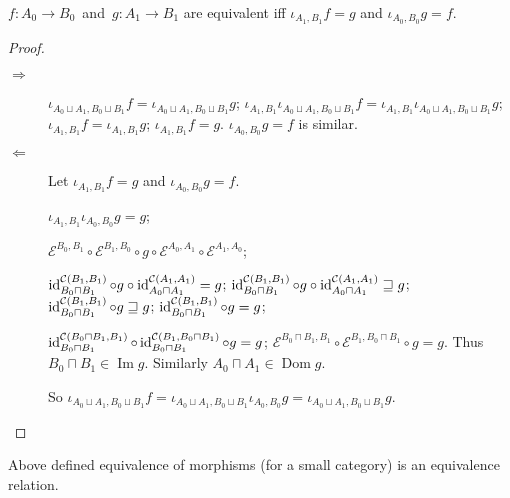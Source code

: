 \begin{thm}
$f:A_0\to B_0$~and~$g:A_1\to B_1$ are equivalent iff
$\iota_{A_1,B_1}f=g$ and $\iota_{A_0,B_0}g=f$.
\end{thm}

\begin{proof}
~
\begin{description}
\item[$\Rightarrow$]
$\iota_{A_0\sqcup A_1,B_0\sqcup B_1}f=\iota_{A_0\sqcup A_1,B_0\sqcup B_1}g$;
$\iota_{A_1,B_1}\iota_{A_0\sqcup A_1,B_0\sqcup B_1}f=\iota_{A_1,B_1}\iota_{A_0\sqcup A_1,B_0\sqcup B_1}g$;
$\iota_{A_1,B_1}f=\iota_{A_1,B_1}g$;
$\iota_{A_1,B_1}f=g$. $\iota_{A_0,B_0}g=f$ is similar.

\item[$\Leftarrow$] Let $\iota_{A_1, B_1} f = g$ and $\iota_{A_0, B_0} g = f$.

$\iota_{A_1, B_1} \iota_{A_0, B_0} g = g$;

$\mathcal{E}^{B_0, B_1} \circ \mathcal{E}^{B_1, B_0} \circ g \circ
\mathcal{E}^{A_0, A_1} \circ \mathcal{E}^{A_1, A_0}$;

$\operatorname{id}^{\mathcal{C} (B_1, B_1)}_{B_0 \sqcap B_1} \circ g \circ
\operatorname{id}^{\mathcal{C} (A_1, A_1)}_{A_0 \sqcap A_1} = g$;
$\operatorname{id}^{\mathcal{C} (B_1, B_1)}_{B_0 \sqcap B_1} \circ g \circ
\operatorname{id}^{\mathcal{C} (A_1, A_1)}_{A_0 \sqcap A_1} \sqsupseteq g$;
$\operatorname{id}^{\mathcal{C} (B_1, B_1)}_{B_0 \sqcap B_1} \circ g \sqsupseteq g$;
$\operatorname{id}^{\mathcal{C} (B_1, B_1)}_{B_0 \sqcap B_1} \circ g = g$;

$\operatorname{id}^{\mathcal{C} (B_0 \sqcap B_1, B_1)}_{B_0 \sqcap B_1} \circ
\operatorname{id}^{\mathcal{C} (B_1, B_0 \sqcap B_1)}_{B_0 \sqcap B_1} \circ g = g$;
$\mathcal{E}^{B_0 \sqcap B_1, B_1} \circ \mathcal{E}^{B_1, B_0 \sqcap B_1}
\circ g = g$. Thus $B_0 \sqcap B_1 \in \operatorname{Im} g$. Similarly $A_0 \sqcap A_1
\in \operatorname{Dom} g$.

So $\iota_{A_0 \sqcup A_1, B_0 \sqcup B_1} f = \iota_{A_0 \sqcup A_1, B_0
\sqcup B_1} \iota_{A_0, B_0} g = \iota_{A_0 \sqcup A_1, B_0 \sqcup B_1} g$.
\end{description}
\end{proof}

\begin{prop}
Above defined equivalence of morphisms (for a small category)
is an equivalence relation.
\end{prop}

